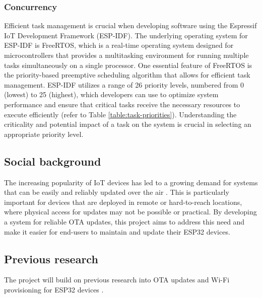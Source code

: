 \subsubsection{Concurrency}
\label{subsec:concurrency}
Efficient task management is crucial when developing software using the Espressif IoT Development Framework (ESP-IDF). The underlying operating system for ESP-IDF is FreeRTOS, which is a real-time operating system designed for microcontrollers that provides a multitasking environment for running multiple tasks simultaneously on a single processor. One essential feature of FreeRTOS is the priority-based preemptive scheduling algorithm that allows for efficient task management. ESP-IDF utilizes a range of 26 priority levels, numbered from 0 (lowest) to 25 (highest), which developers can use to optimize system performance and ensure that critical tasks receive the necessary resources to execute efficiently (refer to Table \ref{table:task-priorities}). Understanding the criticality and potential impact of a task on the system is crucial in selecting an appropriate priority level.

\subsection{Social background}
\label{sec:social}
The increasing popularity of IoT devices has led to a growing demand for systems that can be easily and reliably updated over the air \cite{Villegas:2019}. This is particularly important for devices that are deployed in remote or hard-to-reach locations, where physical access for updates may not be possible or practical. By developing a system for reliable OTA updates, this project aims to address this need and make it easier for end-users to maintain and update their ESP32 devices.

\subsection{Previous research}
\label{sec:previous}
The project will build on previous research into OTA updates and Wi-Fi provisioning for ESP32 devices \cite{espressif:esp-idf-programming-guide}.